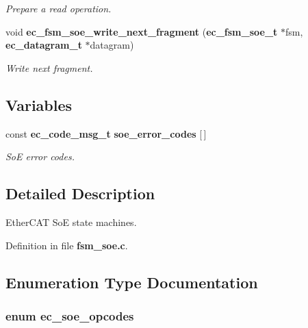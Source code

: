 \begin{DoxyCompactItemize}
\begin{DoxyCompactList}\small\item\em \-Prepare a read operation. \end{DoxyCompactList}\item 
void {\bf ec\-\_\-fsm\-\_\-soe\-\_\-write\-\_\-next\-\_\-fragment} ({\bf ec\-\_\-fsm\-\_\-soe\-\_\-t} $\ast$fsm, {\bf ec\-\_\-datagram\-\_\-t} $\ast$datagram)
\begin{DoxyCompactList}\small\item\em \-Write next fragment. \end{DoxyCompactList}\end{DoxyCompactItemize}
\subsection*{\-Variables}
\begin{DoxyCompactItemize}
\item 
const {\bf ec\-\_\-code\-\_\-msg\-\_\-t} {\bf soe\-\_\-error\-\_\-codes} [$\,$]\label{fsm__soe_8c_a4013ee44d8165e19ed7abec334d499e4}

\begin{DoxyCompactList}\small\item\em \-So\-E error codes. \end{DoxyCompactList}\end{DoxyCompactItemize}


\subsection{\-Detailed \-Description}
\-Ether\-C\-A\-T \-So\-E state machines. 

\-Definition in file {\bf fsm\-\_\-soe.\-c}.



\subsection{\-Enumeration \-Type \-Documentation}
\subsubsection[{ec\-\_\-soe\-\_\-opcodes}]{\setlength{\rightskip}{0pt plus 5cm}enum {\bf ec\-\_\-soe\-\_\-opcodes}}\label{fsm__soe_8c_a9c7163e5550adaf891eb9afff86b72cd}


